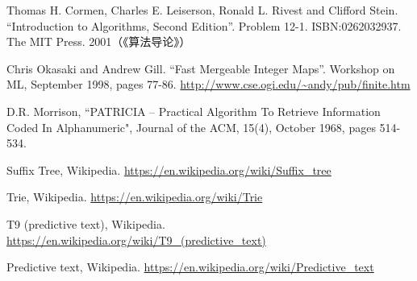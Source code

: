 \documentclass[b5paper]{ctexart}
\begin{document}
\begin{thebibliography}{99}

Thomas H. Cormen, Charles E. Leiserson, Ronald L. Rivest and Clifford Stein.
``Introduction to Algorithms, Second Edition''. Problem 12-1. ISBN:0262032937. The MIT Press. 2001（《算法导论》）

Chris Okasaki and Andrew Gill. ``Fast Mergeable Integer Maps''. Workshop on ML, September 1998, pages 77-86.  \url{http://www.cse.ogi.edu/~andy/pub/finite.htm}

D.R. Morrison, ``PATRICIA -- Practical Algorithm To Retrieve  Information Coded In Alphanumeric", Journal of the ACM, 15(4), October 1968, pages 514-534.

Suffix Tree, Wikipedia. \url{https://en.wikipedia.org/wiki/Suffix_tree}

Trie, Wikipedia. \url{https://en.wikipedia.org/wiki/Trie}

T9 (predictive text), Wikipedia. \url{https://en.wikipedia.org/wiki/T9_(predictive_text)}

Predictive text,
Wikipedia. \url{https://en.wikipedia.org/wiki/Predictive_text}

\end{thebibliography}
\end{document}
